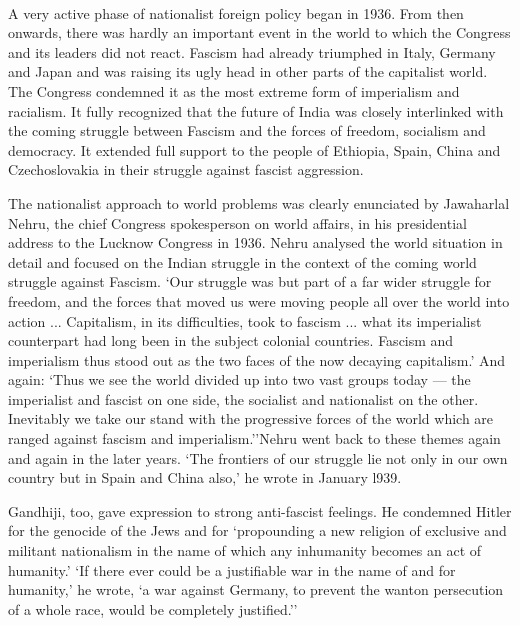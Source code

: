 \begin{multicols}{2}
\paragraph*{}

A very active phase of nationalist foreign policy began in 1936. From then onwards, there was hardly an important event in the world to which the Congress and its leaders did not react. Fascism had already triumphed in Italy, Germany and Japan and was raising its ugly head in other parts of the capitalist world. The Congress condemned it as the most extreme form of imperialism and racialism. It fully recognized that the future of India was closely interlinked with the coming struggle between Fascism and the forces of freedom, socialism and democracy. It extended full support to the people of Ethiopia, Spain, China and Czechoslovakia in their struggle against fascist aggression. 

The nationalist approach to world problems was clearly enunciated by Jawaharlal Nehru, the chief Congress spokesperson on world affairs, in his presidential address to the Lucknow Congress in 1936. Nehru analysed the world situation in detail and focused on the Indian struggle in the context of the coming world struggle against Fascism. `Our struggle was but part of a far wider struggle for freedom, and the forces that moved us were moving people all over the world into action ... Capitalism, in its difficulties, took to fascism ... what its imperialist counterpart had long been in the subject colonial countries. Fascism and imperialism thus stood out as the two faces of the now decaying capitalism.' And again: `Thus we see the world divided up into two vast groups today --- the imperialist and fascist on one side, the socialist and nationalist on the other. Inevitably we take our stand with the progressive forces of the world which are ranged against fascism and imperialism.''Nehru went back to these themes again and again in the later years. `The frontiers of our struggle lie not only in our own country but in Spain and China also,' he wrote in January l939. 

Gandhiji, too, gave expression to strong anti-fascist feelings. He condemned Hitler for the genocide of the Jews and for `propounding a new religion of exclusive and militant nationalism in the name of which any inhumanity becomes an act of humanity.' `If there ever could be a justifiable war in the name of and for humanity,' he wrote, `a war against Germany, to prevent the wanton persecution of a whole race, would be completely justified.'' 


\end{multicols}

